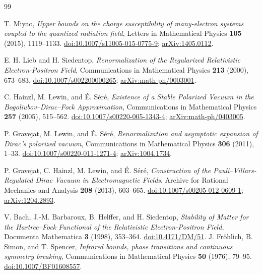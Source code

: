 {}
\begin{thebibliography}{99}
\raggedright
{}
T. Miyao, \emph{Upper bounds on the charge susceptibility of many-electron
systems coupled to the quantized radiation field},
Letters in Mathematical Physics \textbf{105} (2015), 1119--1133.
\href{https://doi.org/10.1007/s11005-015-0775-9}{doi:10.1007/s11005-015-0775-9};
\href{https://arxiv.org/abs/1405.0112}{arXiv:1405.0112}.

E. H. Lieb and H. Siedentop,
\emph{Renormalization of the Regularized Relativistic Electron-Positron Field},
Communications in Mathematical Physics \textbf{213} (2000), 673--683.
\href{https://doi.org/10.1007/s002200000265}{doi:10.1007/s002200000265};
\href{https://arxiv.org/abs/math-ph/0003001}{arXiv:math-ph/0003001}.

C. Hainzl, M. Lewin, and \'{E}. S\'er\'e,
\emph{Existence of a Stable Polarized Vacuum in the
Bogoliubov--Dirac--Fock Approximation},
Communications in Mathematical Physics \textbf{257} (2005), 515--562.
\href{https://doi.org/10.1007/s00220-005-1343-4}{doi:10.1007/s00220-005-1343-4};
\href{https://arxiv.org/abs/math-ph/0403005}{arXiv:math-ph/0403005}.

P. Gravejat, M. Lewin, and \'{E}. S\'er\'e,
\emph{Renormalization and asymptotic expansion of Dirac's polarized vacuum},
Communications in Mathematical Physics \textbf{306} (2011), 1--33.
\href{https://doi.org/10.1007/s00220-011-1271-4}{doi:10.1007/s00220-011-1271-4};
\href{https://arxiv.org/abs/1004.1734}{arXiv:1004.1734}.

P. Gravejat, C. Hainzl, M. Lewin, and \'{E}. S\'er\'e,
\emph{Construction of the Pauli--Villars-Regulated Dirac Vacuum
in Electromagnetic Fields},
Archive for Rational Mechanics and Analysis \textbf{208} (2013), 603--665.
\href{https://doi.org/10.1007/s00205-012-0609-1}{doi:10.1007/s00205-012-0609-1};
\href{https://arxiv.org/abs/1204.2893}{arXiv:1204.2893}.

V. Bach, J.-M. Barbaroux, B. Helffer, and H. Siedentop,
\emph{Stability of Matter for the Hartree--Fock Functional of the
Relativistic Electron-Positron Field},
Documenta Mathematica \textbf{3} (1998), 353--364.
\href{https://doi.org/10.4171/DM/51}{doi:10.4171/DM/51}.
J. Fr\"ohlich, B. Simon, and T. Spencer,
\emph{Infrared bounds, phase transitions and continuous symmetry breaking},
Communications in Mathematical Physics \textbf{50} (1976), 79--95.
\href{https://doi.org/10.1007/BF01608557}{doi:10.1007/BF01608557}.


\end{thebibliography}
